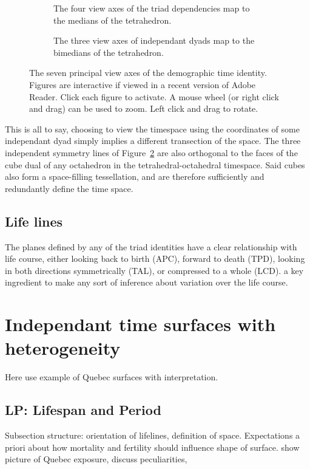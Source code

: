 \begin{figure}
\begin{subfigure}{.48\textwidth}

\caption{The four view axes of the triad dependencies map to the medians of the
tetrahedron.}
\label{fig:depviewaxes}
\end{subfigure}
\begin{subfigure}{.48\textwidth}

\caption{The three view axes of independant dyads map to the bimedians of the
tetrahedron.}
\label{fig:indepviewaxes}
\end{subfigure}
\caption{The seven principal view axes of the demographic time identity.
Figures are interactive if viewed in a recent version of Adobe Reader. Click
each figure to activate. A mouse wheel (or right click and drag) can be used to
zoom. Left click and drag to rotate.}
\label{fig:viewaxes}
\end{figure}

This is all to say, choosing to view the timespace using the coordinates of
some independant dyad simply implies a different transection of the space.
The three independent symmetry lines of Figure~\ref{fig:indepviewaxes} are
also orthogonal to the faces of the cube dual of any octahedron in the
tetrahedral-octahedral timespace. Said cubes also form a space-filling
tessellation, and are therefore sufficiently and redundantly define the time
space.

\subsection{Life lines}
The planes defined by any of the triad identities have a clear relationship with
life course, either looking back to birth (APC), forward to death (TPD),
looking in both directions symmetrically (TAL), or compressed to a whole (LCD).
a key ingredient to make any sort of inference about variation over the life course.


\section{Independant time surfaces with heterogeneity}
Here use example of Quebec surfaces with interpretation.
\subsection{LP: Lifespan and Period}

Subsection structure: orientation of lifelines, definition of space.
Expectations a priori about how mortality and fertility should influence shape
of surface. show picture of Quebec exposure, discuss peculiarities,

